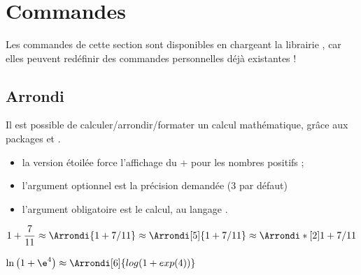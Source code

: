 \begin{PresCodeTexPL}{}

\\          %
\\        %
\\    %
\\        %
\\         %
\end{PresCodeTexPL}

\pagebreak

\section{Commandes}

\begin{tipblock}
Les commandes de cette section sont disponibles en chargeant la librairie , car elles peuvent redéfinir des commandes personnelles déjà existantes !
\end{tipblock}

\subsection{Arrondi}

\begin{tipblock}
Il est possible de calculer/arrondir/formater un calcul mathématique, grâce aux packages  et .

\begin{itemize}
	\item la version étoilée force l'affichage du \og + \fg{} pour les nombres positifs ;
	\item l'argument optionnel est la précision demandée (3 par défaut)
	\item l'argument obligatoire est le calcul, au langage .
\end{itemize}
\vspace*{-\baselineskip}\leavevmode
\end{tipblock}

\begin{PresCodeTexPL}{}
$1+\dfrac{7}{11} \approx \Arrondi{1+7/11} \approx \Arrondi[5]{1+7/11} \approx \Arrondi*[2]{1+7/11}$

$\ln\big(1+\e^{4}\big) \approx \Arrondi[6]{log(1+exp(4))}$
\end{PresCodeTexPL}

